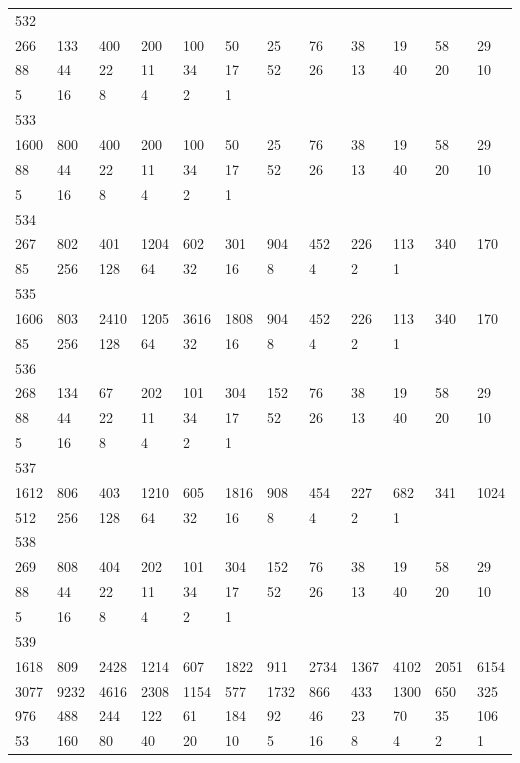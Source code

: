 \begin{longtable}{llllllllllll}
532&&&&&&&&&&&\\
266& 133& 400& 200& 100& 50& 25& 76& 38& 19& 58& 29\\
88& 44& 22& 11& 34& 17& 52& 26& 13& 40& 20& 10\\
5& 16& 8& 4& 2& 1& \\

533&&&&&&&&&&&\\
1600& 800& 400& 200& 100& 50& 25& 76& 38& 19& 58& 29\\
88& 44& 22& 11& 34& 17& 52& 26& 13& 40& 20& 10\\
5& 16& 8& 4& 2& 1& \\

534&&&&&&&&&&&\\
267& 802& 401& 1204& 602& 301& 904& 452& 226& 113& 340& 170\\
85& 256& 128& 64& 32& 16& 8& 4& 2& 1& \\

535&&&&&&&&&&&\\
1606& 803& 2410& 1205& 3616& 1808& 904& 452& 226& 113& 340& 170\\
85& 256& 128& 64& 32& 16& 8& 4& 2& 1& \\

536&&&&&&&&&&&\\
268& 134& 67& 202& 101& 304& 152& 76& 38& 19& 58& 29\\
88& 44& 22& 11& 34& 17& 52& 26& 13& 40& 20& 10\\
5& 16& 8& 4& 2& 1& \\

537&&&&&&&&&&&\\
1612& 806& 403& 1210& 605& 1816& 908& 454& 227& 682& 341& 1024\\
512& 256& 128& 64& 32& 16& 8& 4& 2& 1& \\

538&&&&&&&&&&&\\
269& 808& 404& 202& 101& 304& 152& 76& 38& 19& 58& 29\\
88& 44& 22& 11& 34& 17& 52& 26& 13& 40& 20& 10\\
5& 16& 8& 4& 2& 1& \\

539&&&&&&&&&&&\\
1618& 809& 2428& 1214& 607& 1822& 911& 2734& 1367& 4102& 2051& 6154\\
3077& 9232& 4616& 2308& 1154& 577& 1732& 866& 433& 1300& 650& 325\\
976& 488& 244& 122& 61& 184& 92& 46& 23& 70& 35& 106\\
53& 160& 80& 40& 20& 10& 5& 16& 8& 4& 2& 1\\


\end{longtable}
